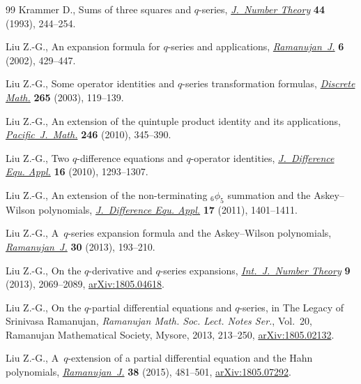 \documentclass[10pt,a4paper]{amsart}
\numberwithin{equation}{section}
\begin{document}
\begin{thebibliography}{99}
Krammer D., Sums of three squares and {$q$}-series, \href{https://doi.org/10.1006/jnth.1993.1050}{\textit{J.~Number Theory}}
 \textbf{44} (1993), 244--254.

Liu Z.-G., An expansion formula for {$q$}-series and applications,
 \href{https://doi.org/10.1023/A:1021306016666}{\textit{Ramanujan~J.}} \textbf{6} (2002), 429--447.

Liu Z.-G., Some operator identities and {$q$}-series transformation formulas,
 \href{https://doi.org/10.1016/S0012-365X(02)00626-X}{\textit{Discrete Math.}} \textbf{265} (2003), 119--139.

Liu Z.-G., An extension of the quintuple product identity and its applications,
 \href{https://doi.org/10.2140/pjm.2010.246.345}{\textit{Pacific~J.~Math.}} \textbf{246} (2010), 345--390.

Liu Z.-G., Two {$q$}-difference equations and {$q$}-operator identities,
 \href{https://doi.org/10.1080/10236190902810385}{\textit{J.~Difference Equ. Appl.}} \textbf{16} (2010), 1293--1307.

Liu Z.-G., An extension of the non-terminating {${}_6\phi_5$} summation and the
 {A}skey--{W}ilson polynomials, \href{https://doi.org/10.1080/10236190903530735}{\textit{J.~Difference Equ. Appl.}} \textbf{17}
 (2011), 1401--1411.

Liu Z.-G., A~{$q$}-series expansion formula and the {A}skey--{W}ilson
 polynomials, \href{https://doi.org/10.1007/s11139-012-9450-2}{\textit{Ramanujan~J.}} \textbf{30} (2013), 193--210.

Liu Z.-G., On the {$q$}-derivative and {$q$}-series expansions,
 \href{https://doi.org/10.1142/S1793042113500759}{\textit{Int.~J.~Number Theory}} \textbf{9} (2013), 2069--2089,
 \href{https://arxiv.org/abs/1805.04618}{arXiv:1805.04618}.

Liu Z.-G., On the {$q$}-partial differential equations and {$q$}-series, in The
 Legacy of {S}rinivasa {R}amanujan, \textit{Ramanujan Math. Soc. Lect. Notes
 Ser.}, Vol.~20, Ramanujan Mathematical Society, Mysore, 2013, 213--250,
 \href{https://arxiv.org/abs/1805.02132}{arXiv:1805.02132}.

Liu Z.-G., A~{$q$}-extension of a partial differential equation and the {H}ahn
 polynomials, \href{https://doi.org/10.1007/s11139-014-9632-1}{\textit{Ramanujan~J.}} \textbf{38} (2015), 481--501,
 \href{https://arxiv.org/abs/1805.07292}{arXiv:1805.07292}.


\end{thebibliography}
\end{document}
